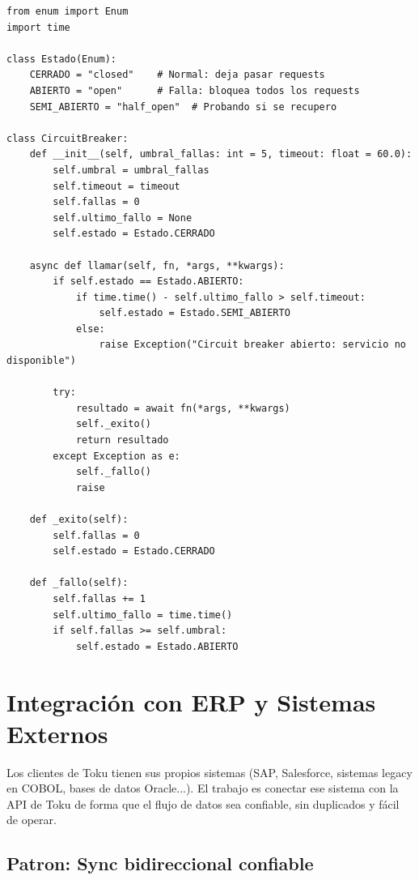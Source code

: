 \documentclass[11pt,a4paper]{article}
\begin{document}
\begin{lstlisting}[style=python]
from enum import Enum
import time

class Estado(Enum):
    CERRADO = "closed"    # Normal: deja pasar requests
    ABIERTO = "open"      # Falla: bloquea todos los requests
    SEMI_ABIERTO = "half_open"  # Probando si se recupero

class CircuitBreaker:
    def __init__(self, umbral_fallas: int = 5, timeout: float = 60.0):
        self.umbral = umbral_fallas
        self.timeout = timeout
        self.fallas = 0
        self.ultimo_fallo = None
        self.estado = Estado.CERRADO

    async def llamar(self, fn, *args, **kwargs):
        if self.estado == Estado.ABIERTO:
            if time.time() - self.ultimo_fallo > self.timeout:
                self.estado = Estado.SEMI_ABIERTO
            else:
                raise Exception("Circuit breaker abierto: servicio no disponible")

        try:
            resultado = await fn(*args, **kwargs)
            self._exito()
            return resultado
        except Exception as e:
            self._fallo()
            raise

    def _exito(self):
        self.fallas = 0
        self.estado = Estado.CERRADO

    def _fallo(self):
        self.fallas += 1
        self.ultimo_fallo = time.time()
        if self.fallas >= self.umbral:
            self.estado = Estado.ABIERTO
\end{lstlisting}

\section{Integración con ERP y Sistemas Externos}

\begin{tcolorbox}[colback=warnambel!5,colframe=warnambel,title=\textbf{El desafío del rol de Integrations Engineer}]
Los clientes de Toku tienen sus propios sistemas (SAP, Salesforce, sistemas legacy en COBOL,
bases de datos Oracle...). El trabajo es conectar ese sistema con la API de Toku de forma
que el flujo de datos sea confiable, sin duplicados y fácil de operar.
\end{tcolorbox}

\subsection{Patron: Sync bidireccional confiable}
\end{document}
